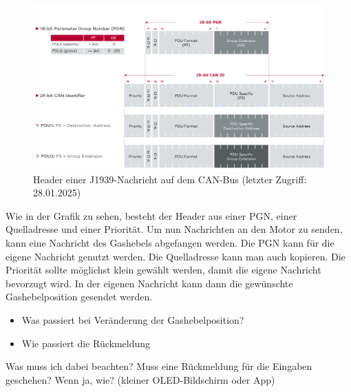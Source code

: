 \begin{figure}[H]
    \centering
    \includegraphics[scale=0.3]{images/j1939header.png}
    \caption{Header einer J1939-Nachricht auf dem CAN-Bus \cite{VektorSAE}(letzter Zugriff: 28.01.2025)}
    \label{fig:j1939header}
\end{figure}
Wie in der Grafik zu sehen, besteht der Header aus einer PGN, einer Quelladresse und einer Priorität. Um nun Nachrichten
an den Motor zu senden, kann eine Nachricht des Gashebels abgefangen werden. Die PGN kann für die eigene Nachricht genutzt
werden. Die Quelladresse kann man auch kopieren. Die Priorität sollte möglichst klein gewählt werden, 
damit die eigene Nachricht bevorzugt wird. In der eigenen Nachricht kann dann die gewünschte Gashebelposition gesendet werden.

\begin{itemize}
    \item Was passiert bei Veränderung der Gashebelposition?
    \item Wie passiert die Rückmeldung
\end{itemize}
Was muss ich dabei beachten?
Muss eine Rückmeldung für die Eingaben geschehen? Wenn ja, wie?
(kleiner OLED-Bildschirm oder App)
